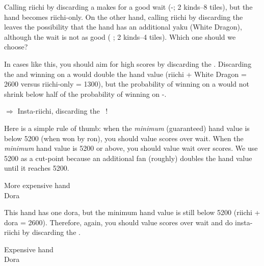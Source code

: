 \noindent Calling {\jap riichi} by discarding a {\large{}} makes for a good wait ({\large {}-}; 2 kinds--8 tiles), but the hand becomes {\jap riichi}-only. On the other hand, calling {\jap riichi} by discarding the {\large{}} leaves the possibility that the hand has an additional {\jap yaku} (White Dragon), although the wait is not as good ({\large {} \bai}; 2 kinds--4 tiles). Which one should we choose?

\bigskip
In cases like this, you should aim for high scores by discarding the {\large{}}. 
Discarding the {\large{}} and winning on a {\large\bai} would double the hand value ({\jap riichi} + White Dragon = 2600 versus {\jap riichi}-only = 1300), but the probability of winning on a {\large\bai} would not shrink below half of the probability of winning on {\large{}-}. 

\begin{center}
{\large $\Rightarrow$ Insta-{\jap riichi}, discarding the ~!}
\end{center}

\noindent Here is a simple rule of thumb: when the \emph{minimum} (guaranteed) hand value is below 5200 (when won by {\jap ron}), you should value scores over wait. When the \emph{minimum} hand value is 5200 or above, you should value wait over scores. 
We use 5200 as a cut-point because an additional {\jap fan} (roughly) doubles the hand value until it reaches 5200. 

\bigskip
\begin{itembox}[r]{More expensive hand}
\bp
{}\bai\bai~~\\
\hspace{311pt}\footnotesize{\jap Dora}
\ep
\vspace{-15pt}
\end{itembox}

\noindent This hand has one {\jap dora}, but the minimum hand value is still below 5200 ({\jap riichi} + {\jap dora} = 2600). Therefore, again, you should value scores over wait and do insta-{\jap riichi} by discarding the {\large {}}. 


\bigskip
\begin{itembox}[r]{Expensive hand}
\bp
{}\bai\bai\bai\fa\fa~~\\
\hspace{311pt}\footnotesize{\jap Dora}
\ep
\vspace{-15pt}
\end{itembox}

